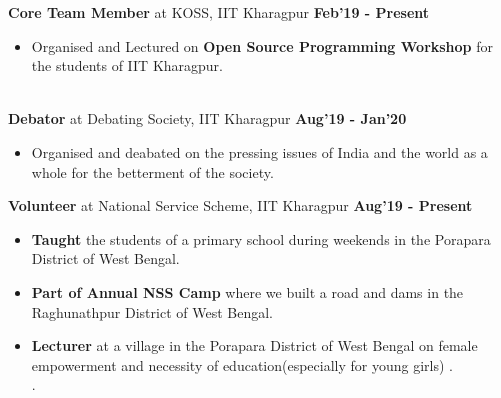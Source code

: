 \documentclass[10pt]{article}
\begin{document}
\vspace{-2.5ex}
\spacedhrule{0.15ex}{2.0ex}
\vspace{-1ex}
\large { \textbf{Core Team Member} at KOSS, IIT Kharagpur} \normalsize
{\hfill} \textbf{Feb'19 - Present}\\[-1.8em]
\begin{itemize}
    \item Organised and Lectured on \textbf{Open Source Programming Workshop} for the students of IIT Kharagpur.\\[-1.5em]
   \end{itemize}
\\
\vspace{-0.5ex}
\large { \textbf{Debator} at Debating Society, IIT Kharagpur} \normalsize
{\hfill} \textbf{Aug'19 - Jan'20}\\[-1.8em]
\begin{itemize}
    \item Organised and deabated on the pressing issues of India and the world as a whole for the betterment of the society.\\[-1.5em]
   \end{itemize}
\vspace{-0.5ex}
\large { \textbf{Volunteer} at National Service Scheme, IIT Kharagpur} \normalsize
{\hfill} \textbf{Aug'19 - Present}\\[-1.8em]
\begin{itemize}
    \item \textbf{Taught} the students of a primary school during weekends in the Porapara District of West Bengal.\\[-2em]
    \item \textbf{Part of Annual NSS Camp} where we built a road and dams in the Raghunathpur District of West Bengal.\\[-2em]
    \item \textbf{Lecturer} at a village in the Porapara District of West Bengal on female empowerment and necessity of education(especially for young girls) .\\[-2em]
    .
\end{itemize}
\end{document}
